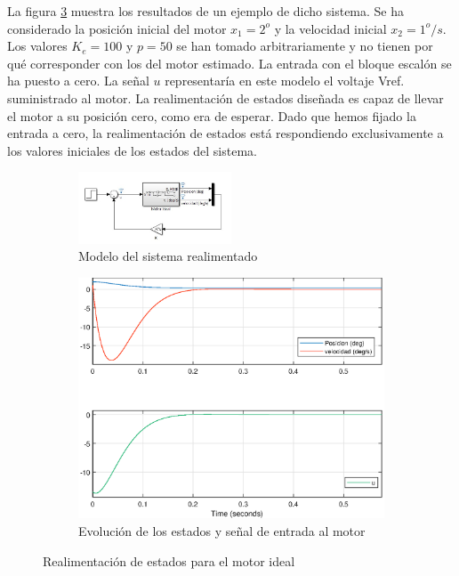 \documentclass[10pt,a4paper]{report}
\begin{document}
La figura \ref{f31b} muestra los resultados de un ejemplo de dicho sistema. Se ha considerado la posición inicial del motor $x_1 = 2^o$ y la velocidad inicial $x_2= 1^o/s$.  Los valores $K_e = 100$ y $p = 50$ se han tomado arbitrariamente y  no tienen por qué corresponder con los del motor estimado. La entrada con el bloque escalón se ha puesto a cero. La señal $u$ representaría en este modelo el voltaje Vref. suministrado al motor. La realimentación de estados diseñada es capaz de llevar el motor a su posición cero, como era de esperar. Dado que hemos fijado la entrada a cero, la realimentación de estados está respondiendo exclusivamente a los valores iniciales de los estados del sistema.
\begin{figure}
\centering
\begin{subfigure}{\textwidth}
\centering
\includegraphics[width=0.5\textwidth]{r_estados.jpg}
\caption{Modelo del sistema realimentado}
\label{f31a}
\end{subfigure}
\begin{subfigure}{\textwidth}
\centering
\includegraphics[scale=0.6]{r_estados.eps}
\caption{Evolución de los estados y señal de entrada al motor}
\label{f31b}
\end{subfigure}
\caption{Realimentación de estados para el motor ideal}
\end{figure}
\end{document}
